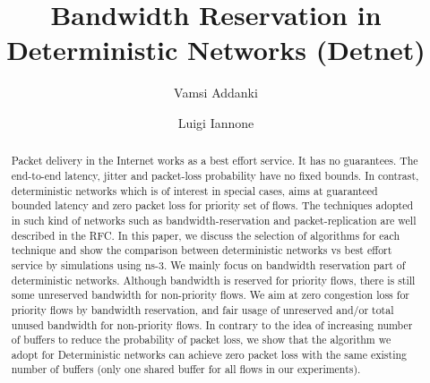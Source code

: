 \documentclass[10pt,sigconf,letterpaper,anonymous]{acmart}
\begin{document}
\title{Bandwidth Reservation in Deterministic Networks (Detnet)}

\author{Vamsi Addanki}

\author{Luigi Iannone}


\renewcommand{\shortauthors}{addanki and luigi, et al.}

\begin{abstract}
 Packet delivery in the Internet works as a best effort service. It has no guarantees. The end-to-end latency, jitter and packet-loss probability have no fixed bounds. In contrast, deterministic networks which is of interest in special cases, aims at guaranteed bounded latency and zero packet loss for priority set of flows. The techniques adopted in such kind of networks such as bandwidth-reservation and packet-replication are well described in the RFC. In this paper, we discuss the selection of algorithms for each technique and show the comparison between deterministic networks vs best effort service by simulations using ns-3. We mainly focus on bandwidth reservation part of deterministic networks. Although bandwidth is reserved for priority flows, there is still some unreserved bandwidth for non-priority flows. We aim at zero congestion loss for priority flows by bandwidth reservation, and fair usage of unreserved and/or total unused bandwidth for non-priority flows. In contrary to the idea of increasing number of buffers to reduce the probability of packet loss, we show that the algorithm we adopt for Deterministic networks can achieve zero packet loss with the same existing number of buffers (only one shared buffer for all flows in our experiments). 
\end{abstract}
\end{document}
